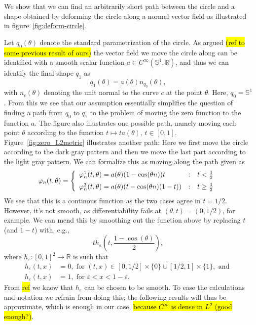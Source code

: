 \documentclass[a4,danish]{article}
\theoremstyle{break}
\theoremstyle{definition}
\theoremstyle{Break}
\newcommand{\R}{\mathbb{R}}
\renewcommand{\S}{\mathbb{S}}
\renewcommand{\phi}{\varphi}
\renewcommand{\epsilon}{\varepsilon}
\begin{document}
We show that we can find an arbitrarily short path between the circle
and a shape obtained by deforming the circle along a normal
vector field as illustrated in figure~\ref{fig:deform-circle}.

Let $q_0(\theta)$ denote the standard parametrization of the circle. As
argued \hl{(ref to some previous result of ours)} the vector field
we move the circle along can be identified with a smooth scalar function $a \in
C^{\infty}(\S^1,\R)$, and thus we can identify the final shape $q_1$
as
\begin{equation*}
  q_1(\theta) = a(\theta)n_{q_0}(\theta),
\end{equation*}
with $n_c(\theta)$ denoting the unit normal to the curve $c$ at the
point $\theta$. Here, $q_0=\S^1$. From this we see that our assumption
essentially simplifies the question of finding a path from $q_0$ to
$q_1$ to the problem of moving the zero function to the function $a$.
The figure also illustrates one possible path, namely moving each
point $\theta$ according to the function $t \mapsto t a(\theta)$, $t \in
[0,1]$. Figure~\ref{fig:zero_L2metric} illustrates another path: Here
we first move the circle according to the dark gray pattern and then
we move the last part according to the light gray pattern. We can
formalize this as moving along the path given as
\begin{equation*}
  \phi_n(t,\theta) =
  \left\{
    \begin{array}{l@{\quad:\quad}l}
      \phi^1_n(t,\theta)=a(\theta)(1-\cos(\theta n)) t & t < \frac{1}{2} \\[0.2cm]
      \phi^2_n(t,\theta)=a(\theta)(t-\cos(\theta n)(1-t)) & t \geq \frac{1}{2}
    \end{array}\right.
\end{equation*}
We see that this is a continous function as the two cases agree in
$t=1/2$. However, it's not smooth, as differentiability fails at
$(\theta,t) = (0,1/2)$, for example. We can mend this by smoothing out
the function above by replacing $t$ (and $1-t$) with, e.g.,
\begin{equation*}
  t h_{\epsilon}
  \left(
    t, \frac{1-\cos(\theta)}{2}
  \right),
\end{equation*}
where $h_{\epsilon}\colon [0,1]^2 \rightarrow \R$ is such that
\begin{equation*}
  \begin{aligned}
    h_{\epsilon}(t,x) & = 0, \text{ for } (t,x) \in [0,1/2] \times \{ 0
    \} \cup [1/2,1] \times \{ 1 \}, \text{ and } \\
    h_{\epsilon}(t,x) & = 1, \text{ for } \epsilon < x < 1-\epsilon.
  \end{aligned}
\end{equation*}
From \hl{ref} we know that $h_{\epsilon}$ can be chosen to be
smooth. To ease the calculations and notation we refrain from doing this; the
following results will thus be approximate, which is enough in our
case, \hl{because $C^{\infty}$ is dense in $L^2$ (good enough?)}.
\end{document}
